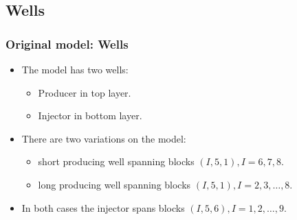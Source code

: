 \documentclass{beamer}
\begin{document}
\subsection{Wells}
\begin{frame}
    \frametitle{Original model: Wells}
    \begin{itemize}
        \item The model has two wells:
            \begin{itemize}
                \item Producer in top layer.
                \item Injector in bottom layer.
            \end{itemize}
        \item There are two variations on the model:
        \begin{itemize}
             \item short producing well spanning blocks $(I,5,1), I=6,7,8$.
             \item long producing well spanning blocks $(I,5,1), I=2,3,\dots,8$.
        \end{itemize}
        \item In both cases the injector spans blocks $(I,5,6),I=1,2,\dots,9$.
    \end{itemize}
\end{frame}
\end{document}

